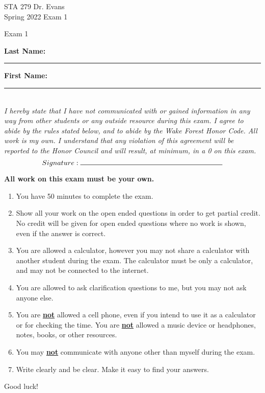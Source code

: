 \documentclass[11pt]{article}
\newcommand{\hl}[1]{\textbf{\underline{#1}}}
\begin{document}
\begin{titlepage}

\enlargethispage{\baselineskip}


STA 279 \hfill Dr. Evans \\
Spring 2022	\hfill Exam 1\\

\vspace{-2cm}

\begin{center}
{\Huge Exam 1}	
\end{center}

$\:$ \\

\textbf{Last Name:} \rule{5cm}{0.5pt}	\hfill	 \textbf{First Name:}  \rule{5cm}{0.5pt}	 \\
$\:$ \\
$\:$ \\

\textit{I hereby state that I have not communicated with or gained information in any way from other students or any outside resource during this exam. I agree to abide by the rules stated below, and to abide by the Wake Forest Honor Code. All work is my own. I understand that any violation of this agreement will be reported to the Honor Council and will result, at minimum, in a 0 on this exam.}
\[ Signature: \rule{7cm}{0.5pt}\]

\hdashrule[0.5ex]{\textwidth}{0.5pt}{3mm}

\textbf{All work on this exam must be your own.}

{\small
\begin{enumerate}
\item You have 50 minutes to complete the exam.
\item Show all your work on the open ended questions in order to get partial credit. No credit will be given for open ended questions where no work is shown, even if the answer is correct.
\item You are allowed a calculator, however you may not share a calculator with another student during the exam. The calculator must be only a calculator, and may not be connected to the internet. 
\item You are allowed to ask clarification questions to me, but you may not ask anyone else. 
\item You are \hl{not} allowed a cell phone, even if you intend to use it as a calculator or for checking the time. You are \hl{not} allowed a music device or headphones, notes, books, or other resources. 
\item You may \hl{not} communicate with anyone other than myself during the exam.
\item Write clearly and be clear. Make it easy to find your answers. 
\end{enumerate}
}
\begin{center}
{\Large Good luck!}
\end{center}
\hdashrule[0.5ex]{\textwidth}{0.5pt}{3mm}


\end{titlepage}
\end{document}
